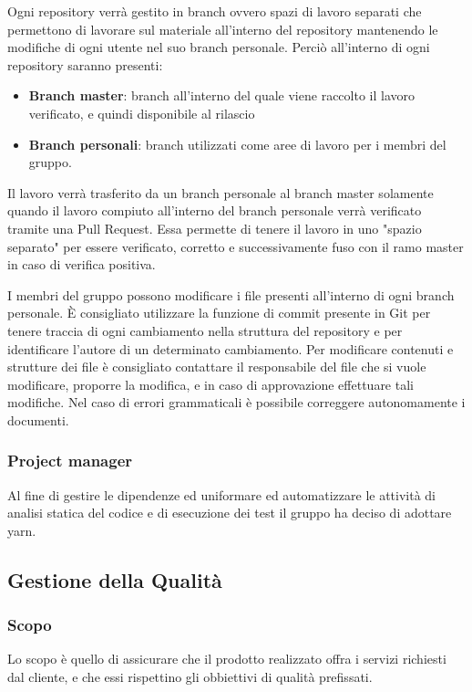 			Ogni repository verrà gestito in branch ovvero spazi di lavoro separati che permettono di lavorare sul materiale all'interno del repository mantenendo le modifiche di ogni utente nel suo branch personale. Perciò all'interno di ogni repository saranno presenti:
			\begin{itemize}
				\item \textbf{Branch master}: branch all'interno del quale viene raccolto il lavoro verificato, e quindi disponibile al rilascio
				\item \textbf{Branch personali}: branch utilizzati come aree di lavoro per i membri del gruppo.
			\end{itemize}
			Il lavoro verrà trasferito da un branch personale al branch master solamente quando il lavoro compiuto all'interno del branch personale verrà verificato tramite una Pull Request. Essa permette di tenere il lavoro in uno "spazio separato" per essere verificato, corretto e successivamente fuso con il ramo master in caso di verifica positiva.
			
			I membri del gruppo possono modificare i file presenti all'interno di ogni branch personale. È consigliato utilizzare la funzione di commit presente in Git per tenere traccia di ogni cambiamento nella struttura del repository e per identificare l'autore di un determinato cambiamento. Per modificare contenuti e strutture dei file è consigliato contattare il responsabile del file che si vuole modificare, proporre la modifica, e in caso di approvazione effettuare tali modifiche. Nel caso di errori grammaticali è possibile correggere autonomamente i documenti. 
	\subsubsection{Project manager}
        Al fine di gestire le dipendenze ed uniformare ed automatizzare le attività di analisi statica del codice e di esecuzione dei test il gruppo ha deciso di adottare yarn.
	\subsection{Gestione della Qualità}
		\subsubsection{Scopo}
		Lo scopo è quello di assicurare che il prodotto realizzato offra i servizi richiesti dal cliente, e che essi rispettino gli obbiettivi di qualità prefissati.
		
